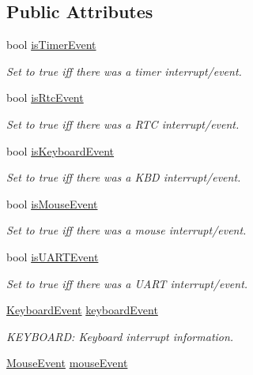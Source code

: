 \subsection*{Public Attributes}
\begin{DoxyCompactItemize}
\item 
bool \mbox{\hyperlink{group__event_ga9ed8eea2d6d0593ed3dd328c0d39cff4}{is\+Timer\+Event}}
\begin{DoxyCompactList}\small\item\em Set to true iff there was a timer interrupt/event. \end{DoxyCompactList}\item 
bool \mbox{\hyperlink{group__event_ga8161d752a03a628ed75607ba51dcf534}{is\+Rtc\+Event}}
\begin{DoxyCompactList}\small\item\em Set to true iff there was a R\+TC interrupt/event. \end{DoxyCompactList}\item 
bool \mbox{\hyperlink{group__event_ga7a5c0340c7ca96d9e3b888d9adeb7953}{is\+Keyboard\+Event}}
\begin{DoxyCompactList}\small\item\em Set to true iff there was a K\+BD interrupt/event. \end{DoxyCompactList}\item 
bool \mbox{\hyperlink{group__event_gad4c9f151571424b2fbf072c61a6b8d49}{is\+Mouse\+Event}}
\begin{DoxyCompactList}\small\item\em Set to true iff there was a mouse interrupt/event. \end{DoxyCompactList}\item 
bool \mbox{\hyperlink{group__event_ga90aa0e2d62ddd6a7df1d4028f5598871}{is\+U\+A\+R\+T\+Event}}
\begin{DoxyCompactList}\small\item\em Set to true iff there was a U\+A\+RT interrupt/event. \end{DoxyCompactList}\item 
\mbox{\hyperlink{struct_keyboard_event}{Keyboard\+Event}} \mbox{\hyperlink{group__event_ga7754ae75522696c89ae768740cb2720c}{keyboard\+Event}}
\begin{DoxyCompactList}\small\item\em K\+E\+Y\+B\+O\+A\+RD\+: Keyboard interrupt information. \end{DoxyCompactList}\item 
\mbox{\hyperlink{struct_mouse_event}{Mouse\+Event}} \mbox{\hyperlink{group__event_ga0cf4f0e41d1890283cf4ac717a7caee7}{mouse\+Event}}

\end{DoxyCompactItemize}
